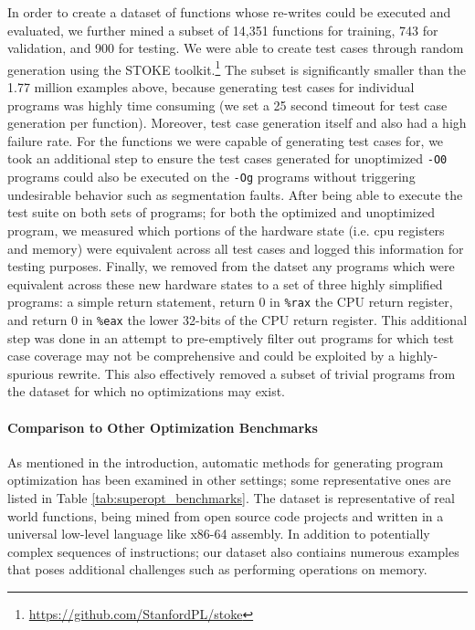 \documentclass{article}
\begin{document}

In order to create a dataset of functions whose re-writes could be executed and evaluated, we further mined a subset of 14,351 functions for training, 743 for validation, and 900 for testing. We were able to create test cases through random generation using the \textsc{STOKE} toolkit.\footnote{\url{https://github.com/StanfordPL/stoke}} The subset is significantly smaller than the 1.77 million examples above, because generating test cases for individual programs was highly time consuming (we set a 25 second timeout for test case generation per function).
Moreover, test case generation itself and also had a high failure rate. For the functions we were capable of generating test cases for, we took an additional step to ensure the test cases generated for unoptimized \texttt{-O0} programs could also be executed on the \texttt{-Og} programs without triggering undesirable behavior such as segmentation faults. After being able to execute the test suite on both sets of programs; for both the optimized and unoptimized program, we measured which portions of the hardware state (i.e. cpu registers and memory) were equivalent across all test cases and logged this information for testing purposes. Finally, we removed from the datset any programs which were equivalent across these new hardware states to a set of three highly simplified programs: a simple return statement, return 0 in \texttt{\%rax} the CPU return register, and return 0 in \texttt{\%eax} the lower 32-bits of the CPU return register. This additional step was done in an attempt to pre-emptively filter out programs for which test case coverage may not be comprehensive and could be exploited by a highly-spurious rewrite. This also effectively removed a subset of trivial programs from the dataset for which no optimizations may exist. 


\paragraph{Comparison to Other Optimization Benchmarks}

As mentioned in the introduction, automatic methods for generating program optimization has been examined in other settings; some representative ones are listed in Table \ref{tab:superopt_benchmarks}. The dataset is representative of real world functions, being mined from open source code projects and written in a universal low-level language like x86-64 assembly. In addition to potentially complex sequences of instructions; our dataset also contiains numerous examples that poses additional challenges such as performing operations on memory. 
\end{document}
